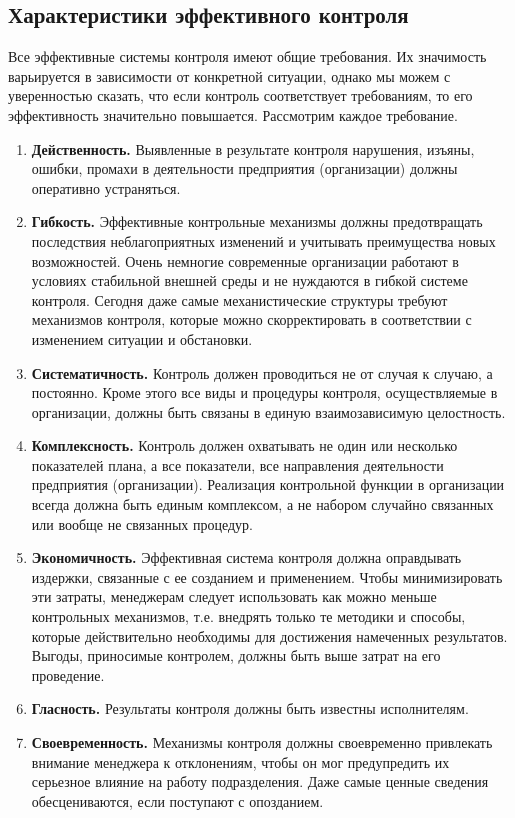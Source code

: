 \documentclass[a4paper,12pt,oneside,final]{extarticle}
\numberwithin{equation}{section}
\begin{document}
\subsection{Характеристики эффективного контроля}
Все эффективные системы контроля имеют общие требования. 
Их значимость варьируется в зависимости от конкретной ситуации, однако мы можем с уверенностью сказать, что если контроль соответствует требованиям, то его эффективность значительно повышается. 
Рассмотрим каждое требование.
\begin{enumerate}
	\item \textbf{Действенность.} 
	Выявленные в результате контроля нарушения, изъяны, ошибки, промахи в деятельности предприятия (организации) должны оперативно устраняться.
	\item \textbf{Гибкость.} 
	Эффективные контрольные механизмы должны предотвращать последствия неблагоприятных изменений и учитывать преимущества новых возможностей. 
	Очень немногие современные организации работают в условиях стабильной внешней среды и не нуждаются в гибкой системе контроля. 
	Сегодня даже самые механистические структуры требуют механизмов контроля, которые можно скорректировать в соответствии с изменением ситуации и обстановки.
	\item \textbf{Систематичность.} Контроль должен проводиться не от случая к случаю, а постоянно. 
	Кроме этого все виды и процедуры контроля, осуществляемые в организации, должны быть связаны в единую взаимозависимую целостность.
	\item \textbf{Комплексность.} 
	Контроль должен охватывать не один или несколько показателей плана, а все показатели, все направления деятельности предприятия (организации). 
	Реализация контрольной функции в организации всегда должна быть единым комплексом, а не набором случайно связанных или вообще не связанных процедур.
	\item \textbf{Экономичность.} 
	Эффективная система контроля должна оправдывать издержки, связанные с ее созданием и применением. 
	Чтобы минимизировать эти затраты, менеджерам следует использовать как можно меньше контрольных механизмов, т.е. внедрять только те методики и способы, которые действительно необходимы для достижения намеченных результатов. 
	Выгоды, приносимые контролем, должны быть выше затрат на его проведение.
	\item \textbf{Гласность.} 
	Результаты контроля должны быть известны исполнителям.
	\item \textbf{Своевременность.} 
	Механизмы контроля должны своевременно привлекать внимание менеджера к отклонениям, чтобы он мог предупредить их серьезное влияние на работу подразделения. Даже самые ценные сведения обесцениваются, если поступают с опозданием. 

\end{enumerate}
\end{document}
